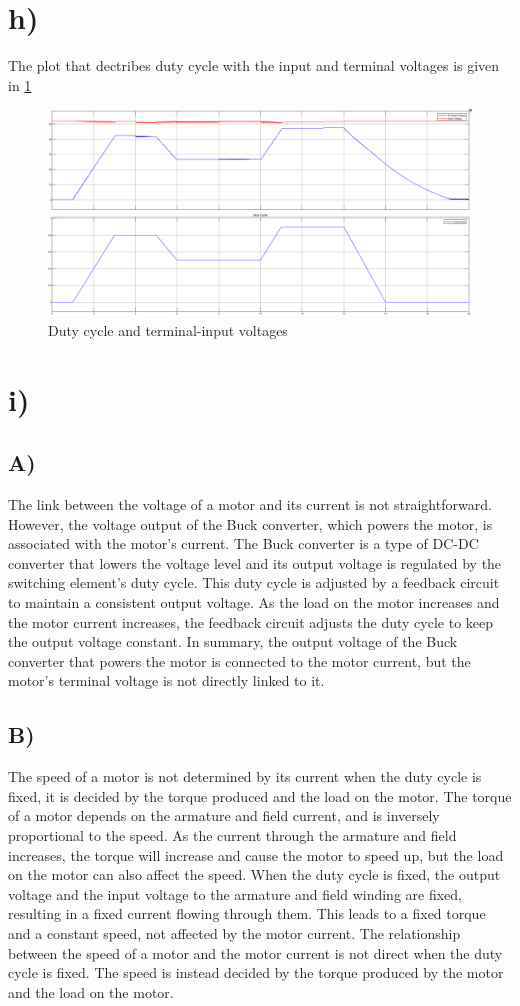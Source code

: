 \documentclass[letterpaper,12pt]{article}
\begin{document}
\section{h)}
The plot that dectribes duty cycle with the input and terminal voltages is given in \ref{voltages2}
\begin{figure}[H]
    \centering
    \includegraphics[width=1\textwidth]{case2_2_terminalvoltage-inputvoltage_dutycycle.png}
    \caption{Duty cycle and terminal-input voltages}
    \label{voltages2}
\end{figure} 
\section{i)}
\subsection{A)}
The link between the voltage of a motor and its current is not straightforward. However, the voltage output of the Buck converter, which powers the motor, is associated with the motor's current. The Buck converter is a type of DC-DC converter that lowers the voltage level and its output voltage is regulated by the switching element's duty cycle. This duty cycle is adjusted by a feedback circuit to maintain a consistent output voltage. As the load on the motor increases and the motor current increases, the feedback circuit adjusts the duty cycle to keep the output voltage constant. In summary, the output voltage of the Buck converter that powers the motor is connected to the motor current, but the motor's terminal voltage is not directly linked to it.
\subsection{B)}
The speed of a motor is not determined by its current when the duty cycle is fixed, it is decided by the torque produced and the load on the motor. The torque of a motor depends on the armature and field current, and is inversely proportional to the speed. As the current through the armature and field increases, the torque will increase and cause the motor to speed up, but the load on the motor can also affect the speed. When the duty cycle is fixed, the output voltage and the input voltage to the armature and field winding are fixed, resulting in a fixed current flowing through them. This leads to a fixed torque and a constant speed, not affected by the motor current. The relationship between the speed of a motor and the motor current is not direct when the duty cycle is fixed. The speed is instead decided by the torque produced by the motor and the load on the motor.
\end{document}

